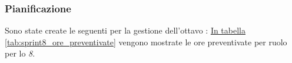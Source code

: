 \subsubsection{Pianificazione}
\label{sec:sprint8_pianificazione}
Sono state create le seguenti  per la gestione dell'ottavo : 
\hyperref[tab:sprint8_ore_preventivate]{In tabella \ref{tab:sprint8_ore_preventivate}} vengono mostrate le ore preventivate per ruolo per lo \textit{ 8}.

\begin{table}[H]
    \centering
    \caption{Ore preventivate per ruolo  8}
    \label{tab:sprint8_ore_preventivate}
\end{table}